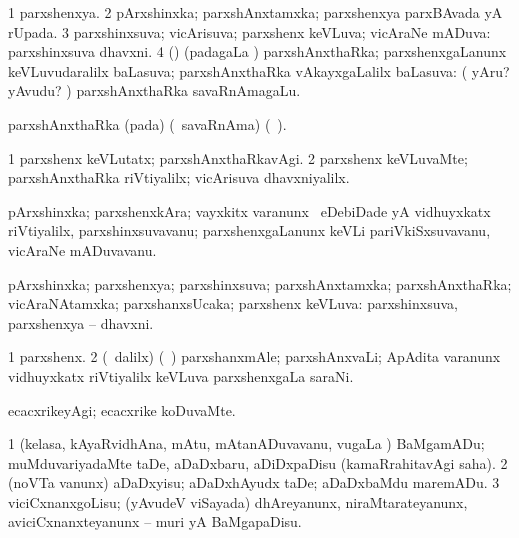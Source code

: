 \bentry
{}
\gl{\gu}
\bmng
\bnum
\num{1} parxshenxya. 
\num{2} pArxshinxka; parxshAnxtamxka; parxshenxya parxBAvada yA rUpada. 
\num{3} parxshinxsuva; vicArisuva; parxshenx keVLuva; vicAraNe mADuva:  parxshinxsuva dhavxni. 
\num{4} (\vAyx) (padagaLa \vi) parxshAnxthaRka; parxshenxgaLanunx keVLuvudaralilx baLasuva; parxshAnxthaRka vAkayxgaLalilx baLasuva:  ( yAru?  yAvudu? \mo) parxshAnxthaRka savaRnAmagaLu. 
\enum
\emng
\eentry

\bentry
{}
\gl{\nA}
\bmng
parxshAnxthaRka (pada) (\kanmu\ savaRnAma) (\udA\ ). 
\emng
\eentry

\bentry
{}
\gl{\kirxvi}
\bmng
\bnum
\num{1} parxshenx keVLutatx; parxshAnxthaRkavAgi. 
\num{2} parxshenx keVLuvaMte; parxshAnxthaRka riVtiyalilx; vicArisuva dhavxniyalilx. 
\enum
\emng
\eentry

\bentry
{}
\gl{\nA}
\bmng
pArxshinxka; parxshenxkAra; vayxkitx \mo varanunx \kanmu\ eDebiDade yA vidhuyxkatx riVtiyalilx, parxshinxsuvavanu; parxshenxgaLanunx keVLi pariVkiSxsuvavanu, vicAraNe mADuvavanu. 
\emng
\eentry

\bentry
{}
\gl{\gu}
\bmng
pArxshinxka; parxshenxya; parxshinxsuva; parxshAnxtamxka; parxshAnxthaRka; vicAraNAtamxka; parxshanxsUcaka; parxshenx keVLuva:  parxshinxsuva, parxshenxya -- dhavxni. 
\emng
\eentry

\bentry
{}
\gl{\nA}
\bmng
\bnum
\num{1} parxshenx. 
\num{2} (\sA\ \bava dalilx) (\kanmu\ \nAyxshA) parxshanxmAle; parxshAnxvaLi; ApAdita \mo varanunx vidhuyxkatx riVtiyalilx keVLuva parxshenxgaLa saraNi. 
\enum
\emng
\eentry

\bentry
{}
\gl{\kirxvi}
\expl{\Latin }
\bmng
ecacxrikeyAgi; ecacxrike koDuvaMte. 
\emng
\eentry

\bentry
{}
\gl{\sakirx}
\bmng
\bnum
\num{1} (kelasa, kAyaRvidhAna, mAtu, mAtanADuvavanu, \mo vugaLa \vi) BaMgamADu; muMduvariyadaMte taDe, aDaDxbaru, aDiDxpaDisu (kamaRrahitavAgi saha). 
\num{2} (noVTa \mo vanunx) aDaDxyisu; aDaDxhAyudx taDe; aDaDxbaMdu maremADu. 
\num{3} viciCxnanxgoLisu; (yAvudeV viSayada) dhAreyanunx, niraMtarateyanunx, aviciCxnanxteyanunx -- muri yA BaMgapaDisu. 
\enum
\emng
\eentry

